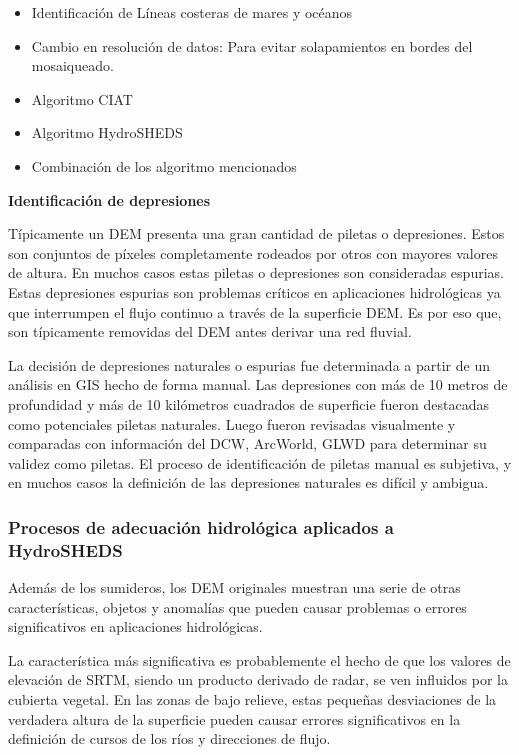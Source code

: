 \documentclass[10pt,a4paper, twoside]{report}
\begin{document}
\begin{itemize}
	\item Identificación de Líneas costeras de mares y océanos
	\item Cambio en resolución de datos: Para evitar solapamientos en bordes del mosaiqueado.
	\item Algoritmo CIAT
	\item Algoritmo HydroSHEDS
	\item Combinación de los algoritmo mencionados
\end{itemize}


\textbf{Identificación de depresiones}

Típicamente un DEM presenta una gran cantidad de piletas o depresiones. Estos son conjuntos de píxeles completamente rodeados por otros con mayores valores de altura. En muchos casos estas piletas o depresiones son consideradas espurias. Estas depresiones espurias son problemas críticos en aplicaciones hidrológicas ya que interrumpen el flujo continuo a través de la superficie DEM. Es por eso que, son típicamente removidas del DEM antes derivar una red fluvial.

La decisión de depresiones naturales o espurias fue determinada a partir de un análisis en GIS hecho de forma manual. Las depresiones con más de 10 metros de profundidad y más de 10 kilómetros cuadrados de superficie fueron destacadas como potenciales piletas naturales. Luego fueron revisadas visualmente y comparadas con información del DCW, ArcWorld, GLWD para determinar su validez como piletas. El proceso de identificación de piletas manual es subjetiva, y en muchos casos la definición de las depresiones naturales es difícil y ambigua.


\subsubsection{Procesos de adecuación hidrológica aplicados a HydroSHEDS}

Además de los sumideros, los DEM originales muestran una serie de otras características, objetos y anomalías que pueden causar problemas o errores significativos en aplicaciones hidrológicas.

La característica más significativa es probablemente el hecho de que los valores de elevación de SRTM, siendo un producto derivado de radar, se ven influidos por la cubierta vegetal. En las zonas de bajo relieve, estas pequeñas desviaciones de la verdadera altura de la superficie pueden causar errores significativos en la definición de cursos de los ríos y direcciones de flujo.
\end{document}
